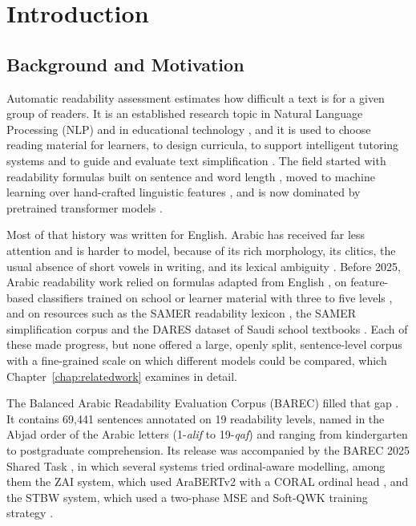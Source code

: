 \chapter{Introduction}\label{chap:introduction}

\section{Background and Motivation}

Automatic readability assessment estimates how difficult a text is for a given group of
readers. It is an established research topic in Natural Language Processing (NLP) and in
educational technology \cite{dubay2004principles,collins2014computational}, and it is used to
choose reading material for learners, to design curricula, to support intelligent tutoring
systems and to guide and evaluate text simplification \cite{vajjala2022trends}. The field
started with readability formulas built on sentence and word length
\cite{flesch1948readability,dale1948formula}, moved to machine learning over hand-crafted
linguistic features \cite{schwarm2005reading}, and is now dominated by pretrained transformer
models \cite{martinc2021supervised,deutsch2020linguistic}.

Most of that history was written for English. Arabic has received far less attention and is
harder to model, because of its rich morphology, its clitics, the usual absence of short
vowels in writing, and its lexical ambiguity \cite{nassiri2023approaches}. Before 2025, Arabic
readability work relied on formulas adapted from English
\cite{al2010automatic,altamimi2014aari,elhaj2016osman}, on feature-based classifiers trained on
school or learner material with three to five levels
\cite{saddiki2018feature,khallaf2021automatic}, and on resources such as the SAMER readability
lexicon \cite{alkhalil2020samer}, the SAMER simplification corpus \cite{alhafni2024samer} and
the DARES dataset of Saudi school textbooks \cite{elhaj2024dares}. Each of these made progress,
but none offered a large, openly split, sentence-level corpus with a fine-grained scale on which
different models could be compared, which Chapter~\ref{chap:relatedwork} examines in detail.

The Balanced Arabic Readability Evaluation Corpus (BAREC) filled that gap
\cite{elmadani2025barec}. It contains 69{,}441 sentences annotated on 19 readability levels,
named in the Abjad order of the Arabic letters (1-\textit{alif} to 19-\textit{qaf}) and ranging
from kindergarten to postgraduate comprehension. Its release was accompanied by the BAREC 2025
Shared Task \cite{elmadani2025sharedtask}, in which several systems tried ordinal-aware
modelling, among them the ZAI system, which used AraBERTv2 with a CORAL ordinal head
\cite{nazzal2025zai}, and the STBW system, which used a two-phase MSE and Soft-QWK training
strategy \cite{trigui2025stbw}.

